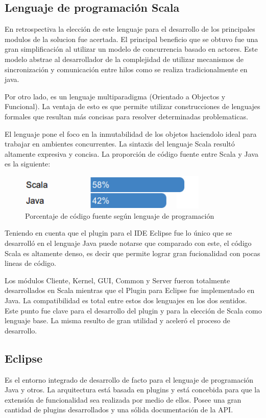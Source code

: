 \documentclass[12pt,a4paper]{article}
\begin{document}
\subsection{Lenguaje de programación Scala}
En retrospectiva la elección de este lenguaje para el desarrollo de los principales modulos de la solucion fue
acertada. El principal beneficio que se obtuvo fue una gran simplificación al utilizar un modelo de concurrencia basado
en actores. Este modelo abstrae al desarrollador de la complejidad de utilizar mecanismos de sincronización y comunicación
entre hilos como se realiza tradicionalmente en java.

Por otro lado, es un lenguaje multiparadigma (Orientado a Objectos y Funcional). La ventaja de esto es que permite utilizar
construcciones de lenguajes formales que resultan más concisas para resolver determinadas problematicas.

El lenguaje pone el foco en la inmutabilidad de los objetos haciendolo ideal para trabajar en ambientes concurrentes.
La sintaxis del lenguaje Scala resultó altamente expresiva y concisa. La proporción de código fuente entre Scala y Java es
la siguiente:

	\begin{figure}[!ht]
		\begin{center}
			\includegraphics[width=9cm]{porcentaje.png}
			\caption{\label{porcentaje} Porcentaje de código fuente según lenguaje de programación }
		\end{center}
	\end{figure}

Teniendo en cuenta que el plugin para el IDE Eclipse fue lo único que se desarrolló en el lenguaje Java puede
notarse que comparado con este, el código Scala es altamente denso, es decir que permite lograr gran fucionalidad con pocas
lineas de código.

Los módulos Cliente, Kernel, GUI, Common y Server fueron totalmente desarrollados en Scala mientras que el Plugin para
Eclipse fue implementado en Java. La compatibilidad es total entre estos dos lenguajes en los dos sentidos. Este punto
fue clave para el desarrollo del plugin y para la elección de Scala como lenguaje base. La misma resulto de gran utilidad
y aceleró el proceso de desarrollo.

\subsection{Eclipse}
Es el entorno integrado de desarrollo de facto para el lenguaje de programación Java y otros. La arquitectura está basada en
plugins y está concebida para que la extensión de funcionalidad sea realizada por medio de ellos. Posee una gran cantidad
de plugins desarrollados y una sólida documentación de la API.
\end{document}
